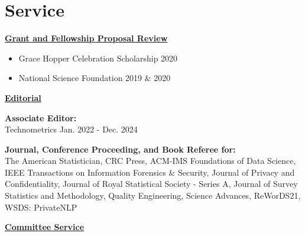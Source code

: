 \documentclass[11pt, letterpaper, roman]{moderncv} %
\begin{document}
\section{Service}

\underline{\textbf{\large Grant and Fellowship Proposal Review}}\normalsize

\vspace{4pt}
\begin{itemize}
    \item Grace Hopper Celebration Scholarship \hfill 2020
    \item National Science Foundation \hfill 2019 \& 2020
\end{itemize}

\vspace{12pt}
\underline{\textbf{\large Editorial}}\normalsize

\textbf{Associate Editor:}\\
Technometrics \hfill Jan. 2022 - Dec. 2024

\vspace{6pt}
\textbf{Journal, Conference Proceeding, and Book Referee for:}\\
The American Statistician, CRC Press, ACM-IMS Foundations of Data Science, IEEE Transactions on Information Forensics \& Security, Journal of Privacy and Confidentiality, Journal of Royal Statistical Society - Series A, Journal of Survey Statistics and Methodology, Quality Engineering, Science Advances, ReWorDS21, WSDS: PrivateNLP

\vspace{12pt}
\underline{\textbf{\large Committee Service}}\normalsize


\vspace{2pt}
\end{document}

